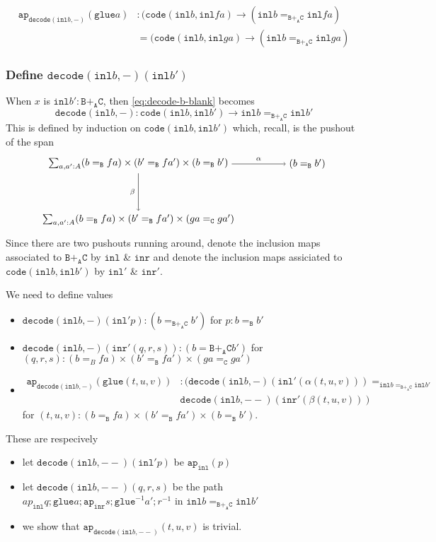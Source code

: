 \documentclass[12pt]{amsart}
\newcommand{\from}{\colon}
\newcommand{\type}[1]{\mathtt{#1}}
\newcommand{\tin}{\colon}
\newcommand{\A}{\type{A}}
\newcommand{\B}{\type{B}}
\newcommand{\C}{\type{C}}
\newcommand{\BAC}{\B +_{\A} \C}
\newcommand{\ap}{\type{ap}}
\newcommand{\inl}{\type{inl}}
\newcommand{\inr}{\type{inr}}
\newcommand{\glue}{\type{glue}}
\newcommand{\code}{\type{code}}
\newcommand{\decode}{\type{decode}}
\theoremstyle{remark}
\theoremstyle{definition}
\begin{document}
\begin{align*}
  \ap_{\decode ( \inl b , - )} (\glue a) &
  \tin
  ( \code ( \inl b , \inl fa ) \to ( \inl b =_{\BAC} \inl fa ) \\
  & =
  ( \code ( \inl b , \inl ga ) \to ( \inl b =_{\BAC} \inl ga )
\end{align*}


\subsubsection{Define \( \decode ( \inl b , - ) ( \inl b' ) \)} %

When \( x \) is \( \inl b' \tin \BAC \), then \ref{eq:decode-b-blank} becomes
\[
  \decode ( \inl b , - )
  \from
  \code ( \inl b , \inl b' )
  \to
  \inl b =_{\BAC} \inl b'
\]
This is defined by induction on \( \code ( \inl b , \inl b' ) \)
which, recall, is the
pushout of the span
\[
\begin{tikzpicture}
  \node (1) at (0,2) { $ \sum_{ a , a' : A }
    ( b =_\B fa ) \times ( b' =_\B fa' ) \times ( b =_\B b' ) $ };
  \node (2) at (6,2) { $ ( b =_\B b' ) $ };
  \node (3) at (0,0) { $ \sum_{ a , a' : A }
    ( b =_\B fa ) \times (b' =_\B fa' ) \times ( ga =_\C ga' ) $ };
  \draw [ -> ] (1) to node [above] {\scriptsize $ \alpha $} (2);
  \draw [ -> ] (1) to node [left] {\scriptsize $ \beta $} (3);
\end{tikzpicture}
\]
Since there are two pushouts running around, denote the inclusion maps
associated to \( \BAC \) by \( \inl \) \& \( \inr \) and denote the
inclusion maps assiciated to \( \code ( \inl b , \inl b' ) \) by \(
\inl' \) \& \( \inr' \). 

We need to define values
%
\begin{itemize}
\item
  \( \decode ( \inl b, - ) (\inl' p) \tin ( b =_{\BAC} b' ) \) for \( p
  \tin b =_{\B} b' \)
\item
  \( \decode (\inl b, - ) ( \inr' (q,r,s) ) \tin ( b ={\BAC} b' ) \)
  for
  \( (q,r,s) \tin ( b =_B fa ) \times (b' =_\B fa' ) \times ( ga =_\C
  ga' ) \)
\item
  \begin{align*}
    \ap_{\decode ( \inl b , - )} ( \glue (t,u,v) ) & \tin
    ( \decode ( \inl b, - ) ( \inl' ( \alpha (t,u,v) ) ) =_{\inl b
    =_{\BAC} \inl b'} \\
    & \decode ( \inl b, -- ) ( \inr' ( \beta (t,u,v) ) )
  \end{align*}
  for \( (t,u,v) \tin ( b =_\B fa ) \times
  ( b' =_\B fa' ) \times ( b =_\B b' ) \). 
\end{itemize}
%
These are respecively
%
\begin{itemize}
\item
  let \( \decode ( \inl b , -- ) ( \inl' p ) \) be
  \( \ap_{\inl} (p) \)
\item
  let \( \decode ( \inl b , -- ) (q,r,s) \) be the path
  \( ap_{\inl} q ; \glue a ; \ap_{\inr} s ; \glue^{-1} a' ; r^{-1} \) in
  \( \inl b =_{\BAC} \inl b' \)
\item
  we show that \( \ap_{\decode ( \inl b , -- )} (t,u,v) \) is trivial.
\end{itemize}
\end{document}
